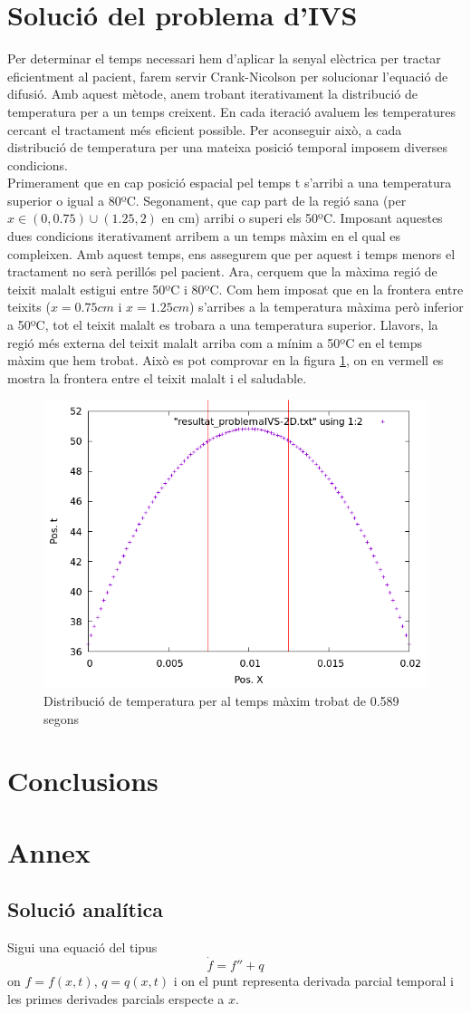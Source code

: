 \documentclass{article}
\begin{document}
\section{Solució del problema d'IVS}
Per determinar el temps necessari hem d'aplicar la senyal elèctrica per tractar eficientment al pacient, farem servir Crank-Nicolson per solucionar l'equació de difusió. Amb aquest mètode, anem trobant iterativament la distribució de temperatura per a un temps creixent. En cada iteració avaluem les temperatures cercant el tractament més eficient possible. Per aconseguir això, a cada distribució de temperatura per una mateixa posició temporal imposem diverses condicions. \\ Primerament que en cap posició espacial pel temps t s'arribi a una temperatura superior o igual a 80ºC. Segonament, que cap part de la regió sana (per $x\in(0,0.75) \cup (1.25,2)$ en cm) arribi o superi els 50ºC. Imposant aquestes dues condicions iterativament arribem a un temps màxim en el qual es compleixen. Amb aquest temps, ens assegurem que per aquest i temps menors el tractament no serà perillós pel pacient. Ara, cerquem que la màxima regió de teixit malalt estigui entre 50ºC i 80ºC. Com hem imposat que en la frontera entre teixits ($x =0.75cm$ i $x=1.25cm$) s'arribes a la temperatura màxima però inferior a 50ºC, tot el teixit malalt es trobara a una temperatura superior. Llavors, la regió més externa del teixit malalt arriba com a mínim a 50ºC en el temps màxim que hem trobat. Això es pot comprovar en la figura \ref{fig:solucion_ivs}, on en vermell es mostra la frontera entre el teixit malalt i el saludable. 

\begin{figure}[h]
    \centering
    \includegraphics[width=0.5\linewidth]{images/solucion_IVS-2D.png}
    \caption{Distribució de temperatura per al temps màxim trobat de 0.589 segons}
    \label{fig:solucion_ivs}
\end{figure}

\section{Conclusions}
\section{Annex}\label{Annex I}
\subsection{Solució analítica}
Sigui una equació del tipus
\begin{equation*}
    \dot{f} = f'' + q
\end{equation*}
on $f = f(x,t)$, $q =q(x,t)$ i on el punt representa derivada parcial temporal i les primes derivades parcials erspecte a $x$.
\end{document}
